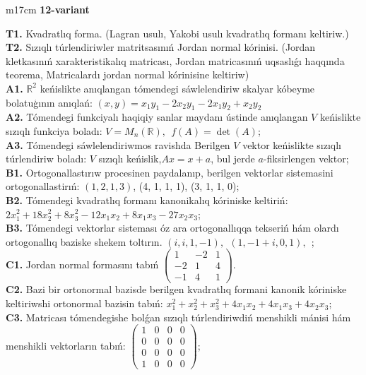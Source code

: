 \documentclass{article}
\begin{document}
\begin{tabular}{m{17cm}}
\textbf{12-variant}
\newline

\textbf{T1.} Kvadratlıq forma. (Lagran usulı, Yakobi usulı kvadratlıq formanı keltiriw.) \\
\textbf{T2.} Sızıqlı túrlendiriwler matritsasınıń Jordan normal kórinisi. (Jordan kletkasınıń xarakteristikalıq matricası, Jordan matricasınıń uqsaslıǵı haqqında teorema,  Matricalardı jordan normal kórinisine keltiriw) \\
\textbf{A1.} \(\mathbb{R}^{2}\) keńislikte anıqlangan tómendegi sáwlelendiriw skalyar kóbeyme bolatuģının anıqlań: \((x,y) = x_{1}y_{1} - 2x_{2}y_{1} - 2x_{1}y_{2} + x_{2}y_{2}\) \\
\textbf{A2.} Tómendegi funkciyalı haqiqiy sanlar maydanı ústinde anıqlangan \(V\) keńislikte sızıqlı funkciya boladı: \(V = M_{n}\left( \mathbb{R} \right),\ \ f(A) = \det(A)\); \\
\textbf{A3.} Tómendegi sáwlelendiriwmos ravishda Berilgen \(V\) vektor keńislikte sızıqlı túrlendiriw boladı: \(V\) sızıqlı keńislik,\(Ax = x + a\), bul jerde \(a\)-fiksirlengen vektor; \\
\textbf{B1.} Ortogonallastırıw procesinen paydalanıp, berilgen vektorlar sistemasini ortogonallastirıń: \((1,2,1,3)\), (4, 1, 1, 1), (3, 1, 1, 0); \\
\textbf{B2.} Tómendegi kvadratlıq formanı kanonikalıq kóriniske keltiriń: \(2x_{1}^{2} + 18x_{2}^{2} + 8x_{3}^{2} - 12x_{1}x_{2} + 8x_{1}x_{3} - 27x_{2}x_{3}\); \\
\textbf{B3.} Tómendegi vektorlar sisteması óz ara ortogonallıqqa tekseriń hám olardı ortogonallıq baziske shekem toltırın. \((i,i,1, - 1),\ \ (1, - 1 + i,0,1),\ \ \); \\
\textbf{C1.} Jordan normal formasını tabıń \(\begin{pmatrix} 1 & - 2 & 1 \\  - 2 & 1 & 4 \\  - 1 & 4 & 1 \end{pmatrix}\). \\
\textbf{C2.} Bazi bir ortonormal bazisde berilgen kvadratlıq formani kanonik kóriniske keltiriwshi ortonormal bazisin tabıń: \(x_{1}^{2} + x_{2}^{2} + x_{3}^{2} + 4x_{1}x_{2} + 4x_{1}x_{3} + 4x_{2}x_{3}\); \\
\textbf{C3.} Matricası tómendegishe bolǵan sızıqlı túrlendiriwdiń menshikli mánisi hám menshikli vektorların tabıń: \(\begin{pmatrix} 1 & 0 & 0 & 0 \\ 0 & 0 & 0 & 0 \\ 0 & 0 & 0 & 0 \\ 1 & 0 & 0 & 0 \end{pmatrix}\); \\

\end{tabular}
\vspace{1cm}
\end{document}
